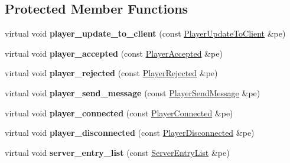 \subsection*{Protected Member Functions}
\begin{DoxyCompactItemize}
\item 
\hypertarget{class_game_command_handler_a7afb31c523176bc0f1c7b2819d520a11}{virtual void {\bfseries player\-\_\-update\-\_\-to\-\_\-client} (const \hyperlink{class_player_update_to_client}{Player\-Update\-To\-Client} \&pe)}\label{class_game_command_handler_a7afb31c523176bc0f1c7b2819d520a11}

\item 
\hypertarget{class_game_command_handler_a4abebde7b787da05ca9611ee97377b06}{virtual void {\bfseries player\-\_\-accepted} (const \hyperlink{class_player_accepted}{Player\-Accepted} \&pe)}\label{class_game_command_handler_a4abebde7b787da05ca9611ee97377b06}

\item 
\hypertarget{class_game_command_handler_a0810bc6966823ed6fde896a8ac2a3bd1}{virtual void {\bfseries player\-\_\-rejected} (const \hyperlink{class_player_rejected}{Player\-Rejected} \&pe)}\label{class_game_command_handler_a0810bc6966823ed6fde896a8ac2a3bd1}

\item 
\hypertarget{class_game_command_handler_a6a87f9769f6b53aabea9800430951e4f}{virtual void {\bfseries player\-\_\-send\-\_\-message} (const \hyperlink{class_player_send_message}{Player\-Send\-Message} \&pe)}\label{class_game_command_handler_a6a87f9769f6b53aabea9800430951e4f}

\item 
\hypertarget{class_game_command_handler_a30a64a6bb2d2fb1d0df89b02777beb99}{virtual void {\bfseries player\-\_\-connected} (const \hyperlink{class_player_connected}{Player\-Connected} \&pe)}\label{class_game_command_handler_a30a64a6bb2d2fb1d0df89b02777beb99}

\item 
\hypertarget{class_game_command_handler_aab0f1e1376b0dd10c343597678cee387}{virtual void {\bfseries player\-\_\-disconnected} (const \hyperlink{class_player_disconnected}{Player\-Disconnected} \&pe)}\label{class_game_command_handler_aab0f1e1376b0dd10c343597678cee387}

\item 
\hypertarget{class_game_command_handler_a6dd8aba8b008733ea05b7854076c063b}{virtual void {\bfseries server\-\_\-entry\-\_\-list} (const \hyperlink{class_server_entry_list}{Server\-Entry\-List} \&pe)}\label{class_game_command_handler_a6dd8aba8b008733ea05b7854076c063b}


\end{DoxyCompactItemize}
